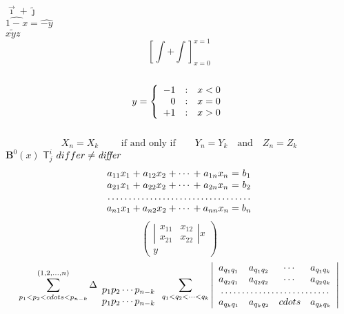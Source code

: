 \documentclass{article}
\begin{document}
	$\vec{\imath} + \tilde{\jmath}$ \\
	$\widehat{1-x}=\widehat{-y}$ \\
	$\widetilde{xyz}$ \\
	\[ \left[ \int + \int \right]_{x=0}^{x=1} \] \\
	\[ y= \left\{\begin{array}{r@{\quad:\quad}l}-1 & x < 0 \\ 0 & x=0 \\ +1 & x > 0 \end{array} \right.\] \\
	\[X_n = X_k \qquad \mbox{ if and only if} \qquad Y_n = Y_k \quad \mbox{and} \quad Z_n = Z_k \]
	$\mathbf{B}^0(x)$ \quad $\mathsf{T}^i_j$
	$\mathnormal{differ} \ne \mathit{differ}$
	\[\begin{array}{*{3}{c@{\:+\:}}c@{\;=\;}c} %
		a_{11}x_1 & a_{12}x_2 & \cdots & a_{1n}x_n & b_1\\
		a_{21}x_1 & a_{22}x_2 & \cdots & a_{2n}x_n & b_2\\
			\multicolumn{5}{c}{\dotfill}			\\
		a_{n1}x_1 & a_{n2}x_2 & \cdots & a_{nn}x_n & b_n
	\end{array} \]
	\[ \left(\begin{array}{c}
		\left|\begin{array}{cc}
		x_{11} & x_{12} \\ x_{21} & x_{22}
		\end{array} \right|
		x \\y \end{array} \right) \]
	\[ \sum_{p_1<p_2<cdots<p_{n-k}}^{(1,2,\ldots,n)}
		\Delta_{\begin{array}{l}
			p_1p_2\cdots p_{n-k} \\ p_1p_2\cdots p_{n-k}
		  \end{array}}
	\sum_{q_1<q_2<\cdots<q_k} \left| \begin{array}{llcl}
			a_{q_1q_1} & a_{q_1q_2} & \cdots & a_{q_1q_k} \\
			a_{q_2q_1} & a_{q_2q_2} & \cdots & a_{q_2q_k} \\
				\multicolumn{4}{c}\dotfill \\
			a_{q_kq_1} & a_{q_kq_2} & cdots & a_{q_kq_k}
				\end{array} \right| \]
\end{document}
